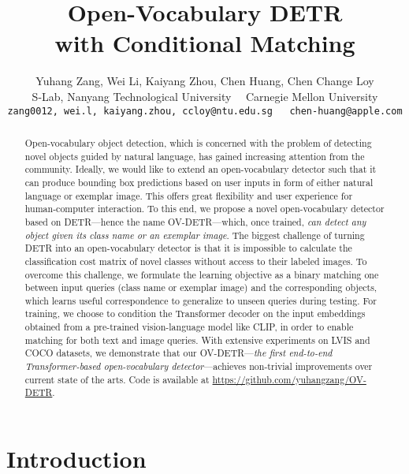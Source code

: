 \documentclass[runningheads]{llncs}
\begin{document}
\pagestyle{headings}
\mainmatter
\def\ECCVSubNumber{}  

\title{Open-Vocabulary DETR \\ with Conditional Matching}

\begin{comment}
\titlerunning{ECCV-22 submission ID \ECCVSubNumber} 
\authorrunning{ECCV-22 submission ID \ECCVSubNumber} 
\author{Anonymous ECCV submission}
\institute{Paper ID \ECCVSubNumber}
\end{comment}


\author{
{
Yuhang Zang, Wei Li, Kaiyang Zhou, Chen Huang, Chen Change Loy\textsuperscript{\Letter}} 
\\
{
S-Lab, Nanyang Technological University ~~Carnegie Mellon University
}
\\
{\tt\small zang0012, wei.l, kaiyang.zhou, ccloy@ntu.edu.sg ~~chen-huang@apple.com}
}
\institute{}
\maketitle
\begin{abstract}
Open-vocabulary object detection, which is concerned with the problem of detecting novel objects guided by natural language, has gained increasing attention from the community. Ideally, we would like to extend an open-vocabulary detector such that it can produce bounding box predictions based on user inputs in form of either natural language or exemplar image. This offers great flexibility and user experience for human-computer interaction. To this end, we propose a novel open-vocabulary detector based on DETR---hence the name OV-DETR---which, once trained, \emph{can detect any object given its class name or an exemplar image}. The biggest challenge of turning DETR into an open-vocabulary detector is that it is impossible to calculate the classification cost matrix of novel classes without access to their labeled images.
To overcome this challenge, we formulate the learning objective as a binary matching one between input queries (class name or exemplar image) and the corresponding objects, which learns useful correspondence to generalize to unseen queries during testing. For training, we choose to condition the Transformer decoder on the input embeddings obtained from a pre-trained vision-language model like CLIP, in order to enable matching for both text and image queries.
With extensive experiments on LVIS and COCO datasets, we demonstrate that our OV-DETR---\emph{the first end-to-end Transformer-based open-vocabulary detector}---achieves non-trivial improvements over current state of the arts. Code is available at \url{https://github.com/yuhangzang/OV-DETR}.
\end{abstract} \section{Introduction}
\end{document}
